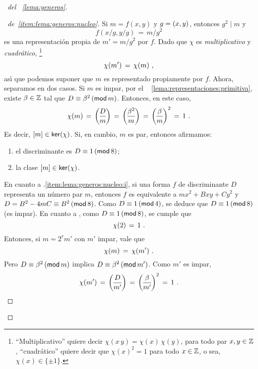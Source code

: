 \begin{proof}[\proofname~del \lemaname~\ref{lema:generos}]
	\begin{proof}[\proofname~de~\ref{item:lema:generos:nucleo}]
		Si $m=f(x,y)$ y $g=\mcd{x,y}$, entonces $g^2\mid m$ y
		\begin{displaymath}
			f(x/g,y/g)\,=\,m/g^2
		\end{displaymath}
		es una representaci\'on propia de $m'=m/g^2$ por $f$.
		Dado que $\chi$ es \emph{multiplicativo} y
		\emph{cuadr\'atico},%
		\footnote{
			``Multiplicativo'' quiere decir
			$\chi(x\,y)=\chi(x)\,\chi(y)$, para todo par
			$x,y\in\Enteros$,
			``cuadr\'atico'' quiere decir que
			$\chi(x)^2=1$ para todo $x\in\Enteros$,
			o sea, $\chi(x)\in\{\pm 1\}$.
		}
		\begin{displaymath}
			\chi(m')\,=\,\chi(m)
			\dispcomma
		\end{displaymath}
		as\'{\i} que podemos suponer que $m$ es representado
		propiamente por $f$. Ahora, separamos en dos casos.
		Si $m$ es impar, por el \lemaname~%
		\ref{lema:representaciones:primitiva}, existe
		$\beta\in\Enteros$ tal que $D\equiv\beta^2\tmodulo[m]$.
		Entonces, en este caso,
		\begin{displaymath}
			\chi(m)\,=\,\legendre D m\,=\,
				\legendre{\beta^2} m\,=\,
				\legendre \beta m^2\,=\,1
			\dispstop
		\end{displaymath}
		Es decir, $\clase m\in\ker(\chi)$.
		Si, en cambio, $m$ es par, entonces afirmamos:
		\begin{enumerate}[{.}1]
			\item\label{item:lema:generos:nucleo:i}
				el discriminante es $D\equiv 1\tmodulo[8]$;
			\item\label{item:lema:generos:nucleo:ii}
				la clase $\clase m\in\ker(\chi)$.
		\end{enumerate}
		En cuanto a {.\ref{item:lema:generos:nucleo:i}},
		si una forma $f$ de discriminante $D$ representa un
		n\'umero par $m$, entonces $f$ es equivalente a
		$mx^2+Bxy+Cy^2$ y $D=B^2-4mC\equiv B^2\tmodulo[8]$.
		Como $D\equiv 1\tmodulo[4]$, se deduce que
		$D\equiv 1\tmodulo[8]$ (es impar).
		En cuanto a \label{item:lema:generos:nucleo:ii},
		como $D\equiv 1\tmodulo[8]$, se cumple que
		\begin{displaymath}
			\chi(2)\,=\,1
			\dispstop
		\end{displaymath}
		Entonces, si $m=2^r m'$ con $m'$ impar, vale que
		\begin{displaymath}
			\chi(m)\,=\,\chi(m')
			\dispstop
		\end{displaymath}
		Pero $D\equiv\beta^2\tmodulo[m]$ implica
		$D\equiv\beta^2\tmodulo[m']$. Como $m'$ es impar,
		\begin{displaymath}
			\chi(m')\,=\,\legendre D{m'}\,=\,
				\legendre \beta{m'}^2\,=\,1
			\dispstop
		\end{displaymath}
	\end{proof}


\end{proof}
